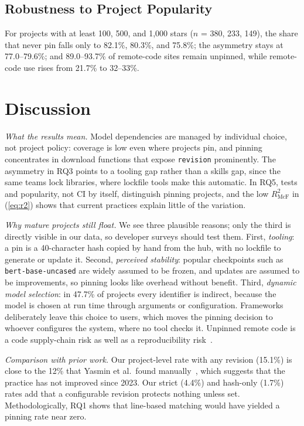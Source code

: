 \documentclass[conference]{IEEEtran}
\begin{document}
\subsection{Robustness to Project Popularity}
For projects with at least 100, 500, and 1,000 stars ($n$ = 380, 233, 149), the share that never pin falls only to 82.1\%, 80.3\%, and 75.8\%; the asymmetry stays at 77.0--79.6\%; and 89.0--93.7\% of remote-code sites remain unpinned, while remote-code use rises from 21.7\% to 32--33\%.

\section{Discussion}


\textit{What the results mean.} Model dependencies are managed by individual choice, not project policy: coverage is low even where projects pin, and pinning concentrates in download functions that expose \texttt{revision} prominently. The asymmetry in RQ3 points to a tooling gap rather than a skills gap, since the same teams lock libraries, where lockfile tools make this automatic. In RQ5, tests and popularity, not CI by itself, distinguish pinning projects, and the low $R^2_{\mathrm{McF}}$ in (\ref{eq:r2}) shows that current practices explain little of the variation.

\textit{Why mature projects still float.} We see three plausible reasons; only the third is directly visible in our data, so developer surveys should test them. First, \emph{tooling}: a pin is a 40-character hash copied by hand from the hub, with no lockfile to generate or update it. Second, \emph{perceived stability}: popular checkpoints such as \texttt{bert-base-uncased} are widely assumed to be frozen, and updates are assumed to be improvements, so pinning looks like overhead without benefit. Third, \emph{dynamic model selection}: in 47.7\% of projects every identifier is indirect, because the model is chosen at run time through arguments or configuration. Frameworks deliberately leave this choice to users, which moves the pinning decision to whoever configures the system, where no tool checks it. Unpinned remote code is a code supply-chain risk as well as a reproducibility risk~\cite{zhao2024}.

\textit{Comparison with prior work.} Our project-level rate with any revision (15.1\%) is close to the 12\% that Yasmin et al.\ found manually~\cite{yasmin2025}, which suggests that the practice has not improved since 2023. Our strict (4.4\%) and hash-only (1.7\%) rates add that a configurable revision protects nothing unless set. Methodologically, RQ1 shows that line-based matching would have yielded a pinning rate near zero.
\end{document}
